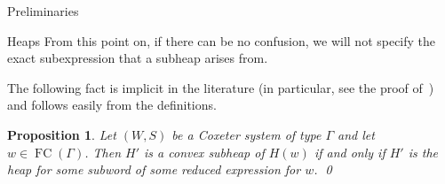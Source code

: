 \documentclass[11pt]{amsart}
\newtheorem{lemma}[theorem]{Lemma}
\newtheorem{proposition}[theorem]{Proposition}
\theoremstyle{definition}
\numberwithin{equation}{section}
\newcommand{\C}{\widetilde{C}}
\renewcommand{\(}{\left(}
\renewcommand{\)}{\right)}
\DeclareMathOperator{\FC}{FC}
\newcommand\xxaxis{0}
\newcommand\yyaxis{90}
\newcommand\heapblank[2]{\fill[fill=white, dotted, draw=black, line width=1.1pt, rounded corners, shift={(\xxaxis:#1)},shift={(\yyaxis:#2)}] (-1,-0.5) rectangle (1,0.5);}
\begin{document}
\begin{section}{Preliminaries}
\begin{subsection}{Heaps}
From this point on, if there can be no confusion, we will not specify the exact subexpression that a subheap arises from.

The following fact is implicit in the literature (in particular, see the proof of~\cite[Proposition 3.3]{Stembridge1996}) and follows easily from the definitions.

\begin{proposition}
Let $(W,S)$ be a Coxeter system of type $\Gamma$ and let $w \in \FC(\Gamma)$. Then $H'$ is a convex subheap of $H(w)$ if and only if $H'$ is the heap for some subword of some reduced expression for $w$.   \qed
\end{proposition}




\end{subsection}
\end{section}
\end{document}
